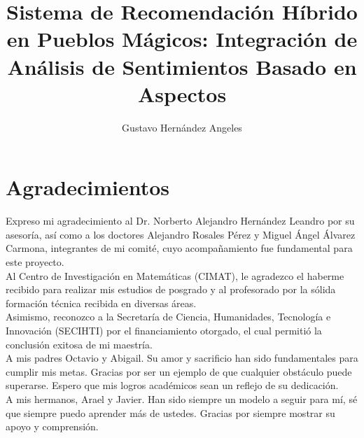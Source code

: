 \documentclass[letterpaper,12pt,twoside]{book}  %
\author{Gustavo Hernández Angeles}
\title{Sistema de Recomendación Híbrido en Pueblos Mágicos: Integración de Análisis de Sentimientos Basado en Aspectos}
\begin{document}
\maketitle  %

\thispagestyle{empty}  %

\frontmatter



\chapter*{Agradecimientos}

\noindent Expreso mi agradecimiento al Dr. Norberto Alejandro Hernández Leandro por su asesoría, así como a los doctores Alejandro Rosales Pérez y Miguel Ángel Álvarez Carmona, integrantes de mi comité, cuyo acompañamiento fue fundamental para este proyecto.\\[0.2cm]

\noindent Al Centro de Investigación en Matemáticas (CIMAT), le agradezco el haberme recibido para realizar mis estudios de posgrado y al profesorado por la sólida formación técnica recibida en diversas áreas.\\[0.2cm]

\noindent Asimismo, reconozco a la Secretaría de Ciencia, Humanidades, Tecnología e Innovación (SECIHTI) por el financiamiento otorgado, el cual permitió la conclusión exitosa de mi maestría.\\[0.2cm]

\noindent A mis padres Octavio y Abigail. Su amor y sacrificio han sido fundamentales para cumplir mis metas. Gracias por ser un ejemplo de que cualquier obstáculo puede superarse. Espero que mis logros académicos sean un reflejo de su dedicación. \\[0.2cm]

\noindent A mis hermanos, Arael y Javier. Han sido siempre un modelo a seguir para mí, sé que siempre puedo aprender más de ustedes. Gracias por siempre mostrar su apoyo y comprensión. \\[0.2cm]
\end{document}
